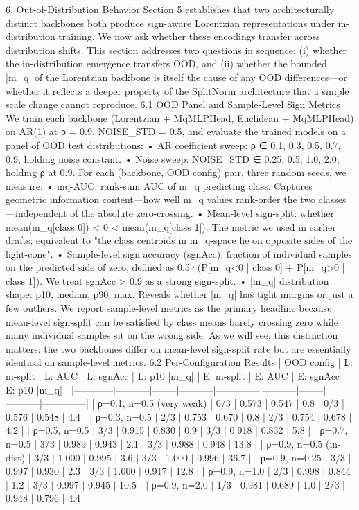 6. Out-of-Distribution Behavior
Section 5 establishes that two architecturally distinct backbones both produce sign-aware Lorentzian representations under in-distribution training. We now ask whether these encodings transfer across distribution shifts. This section addresses two questions in sequence: (i) whether the in-distribution emergence transfers OOD, and (ii) whether the bounded |m_q| of the Lorentzian backbone is itself the cause of any OOD differences—or whether it reflects a deeper property of the SplitNorm architecture that a simple scale change cannot reproduce.
6.1 OOD Panel and Sample-Level Sign Metrics
We train each backbone (Lorentzian + MqMLPHead, Euclidean + MqMLPHead) on AR(1) at ρ = 0.9, NOISE_STD = 0.5, and evaluate the trained models on a panel of OOD test distributions:
	•	AR coefficient sweep: ρ ∈ {0.1, 0.3, 0.5, 0.7, 0.9}, holding noise constant.
	•	Noise sweep: NOISE_STD ∈ {0.25, 0.5, 1.0, 2.0}, holding ρ at 0.9.
For each (backbone, OOD config) pair, three random seeds, we measure:
	•	mq-AUC: rank-sum AUC of m_q predicting class. Captures geometric information content—how well m_q values rank-order the two classes—independent of the absolute zero-crossing.
	•	Mean-level sign-split: whether mean(m_q[class 0]) < 0 < mean(m_q[class 1]). The metric we used in earlier drafts; equivalent to "the class centroids in m_q-space lie on opposite sides of the light-cone".
	•	Sample-level sign accuracy (sgnAcc): fraction of individual samples on the predicted side of zero, defined as 0.5·(P[m_q<0 | class 0] + P[m_q>0 | class 1]). We treat sgnAcc > 0.9 as a strong sign-split.
	•	|m_q| distribution shape: p10, median, p90, max. Reveals whether |m_q| has tight margins or just a few outliers.
We report sample-level metrics as the primary headline because mean-level sign-split can be satisfied by class means barely crossing zero while many individual samples sit on the wrong side. As we will see, this distinction matters: the two backbones differ on mean-level sign-split rate but are essentially identical on sample-level metrics.
6.2 Per-Configuration Results
| OOD config | L: m-split | L: AUC | L: sgnAcc | L: p10 |m_q| | E: m-split | E: AUC | E: sgnAcc | E: p10 |m_q| | |------------|-----------|--------|-----------|--------------|-----------|--------|-----------|--------------| | ρ=0.1, n=0.5 (very weak) | 0/3 | 0.573 | 0.547 | 0.8 | 0/3 | 0.576 | 0.548 | 4.4 | | ρ=0.3, n=0.5 | 2/3 | 0.753 | 0.670 | 0.8 | 2/3 | 0.754 | 0.678 | 4.2 | | ρ=0.5, n=0.5 | 3/3 | 0.915 | 0.830 | 0.9 | 3/3 | 0.918 | 0.832 | 5.8 | | ρ=0.7, n=0.5 | 3/3 | 0.989 | 0.943 | 2.1 | 3/3 | 0.988 | 0.948 | 13.8 | | ρ=0.9, n=0.5 (in-dist) | 3/3 | 1.000 | 0.995 | 3.6 | 3/3 | 1.000 | 0.996 | 36.7 | | ρ=0.9, n=0.25 | 3/3 | 0.997 | 0.930 | 2.3 | 3/3 | 1.000 | 0.917 | 12.8 | | ρ=0.9, n=1.0 | 2/3 | 0.998 | 0.844 | 1.2 | 3/3 | 0.997 | 0.945 | 10.5 | | ρ=0.9, n=2.0 | 1/3 | 0.981 | 0.689 | 1.0 | 2/3 | 0.948 | 0.796 | 4.4 |
